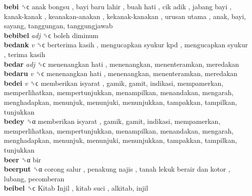 \textbf{bebi} ␝ϲ   anak bongsu ,  bayi baru lahir ,  buah hati ,  cik adik ,  jabang bayi ,  kanak-kanak ,  keanakan-anakan ,  kekanak-kanakan ,  urusan utama , anak, bayi, sayang, tanggungan, tanggungjawab  \\
\textbf{bebibel} \emph{adj}  ␝ϲ   boleh diminum   \\
\textbf{bedank} \emph{v}  ␝ϲ   berterima kasih ,  mengucapkan syukur kpd ,  mengucapkan syukur ,  terima kasih   \\
\textbf{bedar} \emph{adj}  ␝ϲ   menenangkan hati , menenangkan, menenteramkan, meredakan  \\
\textbf{bedaru} \emph{v}  ␝ϲ   menenangkan hati , menenangkan, menenteramkan, meredakan  \\
\textbf{bedei} \emph{v}  ␝ϲ   memberikan isyarat , gamik, gamit, indikasi, mempamerkan, memperlihatkan, mempertunjukkan, menampilkan, menandakan, mengarah, menghadapkan, menunjuk, menunjuki, menunjukkan, tampakkan, tampilkan, tunjukkan  \\
\textbf{bedey} ␝α   memberikan isyarat , gamik, gamit, indikasi, mempamerkan, memperlihatkan, mempertunjukkan, menampilkan, menandakan, mengarah, menghadapkan, menunjuk, menunjuki, menunjukkan, tampakkan, tampilkan, tunjukkan  \\
\textbf{beer} ␝α  bir  \\
\textbf{beerput} ␝α   corong salur ,  penakung najis ,  tanah lekuk berair dan kotor , lubang, pecomberan  \\
\textbf{beibel} ␝ϲ   Kitab Injil ,  kitab suci , alkitab, injil  \\

